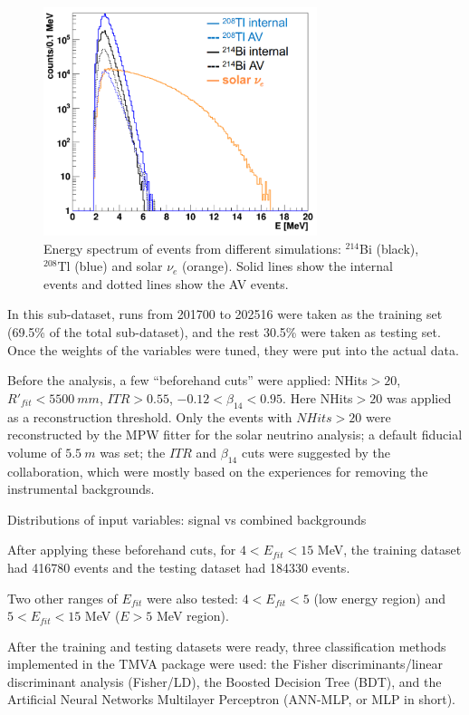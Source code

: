 \begin{figure}[!htb]
	\centering
	\includegraphics[width=8cm]{TMVA_bkgs_1.png}
	\caption[Energy spectrum of events from different simulations.]{Energy spectrum of events from different simulations: $^{214}$Bi (black), $^{208}$Tl (blue) and solar $\nu_e$ (orange). Solid lines show the internal events and dotted lines show the AV events.}
	\label{TMVA_bkgs_1}
\end{figure}

In this sub-dataset, runs from 201700 to 202516 were taken as the training set (69.5\% of the total sub-dataset), and the rest 30.5\% were taken as testing set. Once the weights of the variables were tuned, they were put into the actual data.

Before the analysis, a few ``beforehand cuts'' were applied: NHits$>20$, $R'_{fit}<5500~mm$, $ITR>0.55$, $-0.12<\beta_{14}<0.95$. Here NHits$>20$ was applied as a reconstruction threshold. Only the events with $NHits>20$ were reconstructed by the MPW fitter for the solar neutrino analysis; a default fiducial volume of $5.5~m$ was set; the $ITR$ and $\beta_{14}$ cuts were suggested by the collaboration, which were mostly based on the experiences for removing the instrumental backgrounds\cite{waterunidoc}. 

Distributions of input variables:
signal vs combined backgrounds



After applying these beforehand cuts, for $4<E_{fit}<15$ MeV, the training dataset had 416780 events and the testing dataset had 184330 events.

Two other ranges of $E_{fit}$ were also tested: $4<E_{fit}<5$ (low energy region) and $5<E_{fit}<15$ MeV ($E>5$ MeV region). %

After the training and testing datasets were ready, three classification methods implemented in the TMVA package were used: the Fisher discriminants/linear discriminant analysis (Fisher/LD), the Boosted Decision Tree (BDT), and the Artificial Neural Networks Multilayer Perceptron (ANN-MLP, or MLP in short)\cite{albertsson2007tmva}.

